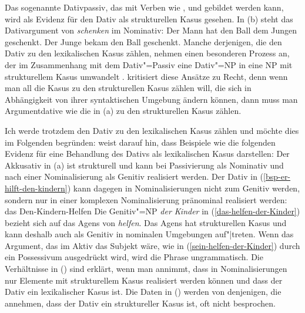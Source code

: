 %
%
Das sogenannte Dativpassiv, das mit Verben wie
,  und  gebildet werden kann,
wird als Evidenz für den Dativ als strukturellen Kasus gesehen.
In (b) steht das Dativargument von \emph{schenken} im Nominativ:
\eal
\ex Der Mann  hat   den Ball dem Jungen geschenkt.
\ex Der Junge bekam den Ball            geschenkt.
\zl
Manche derjenigen, die den Dativ zu den lexikalischen Kasus zählen, nehmen
einen besonderen Prozess an, der im Zusammenhang mit dem Dativ"=Passiv
eine Dativ"=NP in eine NP mit strukturellem Kasus umwandelt 
\parencites[Abschnitt~4.1]{Haider86}[]{HM94a}[]{Mueller99a}.
\citet{Gunkel2003b} kritisiert diese Ansätze zu Recht, denn wenn man all die
Kasus zu den strukturellen Kasus zählen will, die sich in Abhängigkeit von
ihrer syntaktischen Umgebung ändern können, dann muss man Argumentdative wie die
in (a) zu den strukturellen Kasus zählen.

Ich werde trotzdem den Dativ zu den lexikalischen Kasus zählen und möchte dies im Folgenden
begründen: \citet[]{Haider86} weist darauf hin, dass Beispiele wie die folgenden Evidenz
für eine Behandlung des Dativs als lexikalischen Kasus darstellen:
\eal
{}
\label{das-helfen-der-Kinder}
\label{sein-helfen-der-Kinder}
\zl
Der Akkusativ in (a) ist strukturell und kann bei Passivierung als Nominativ
und nach einer Nominalisierung als Genitiv realisiert werden.
Der Dativ in (\ref{bsp-er-hilft-den-kindern}) kann dagegen in Nominalisierungen nicht zum Genitiv werden,
sondern nur in einer komplexen Nominalisierung pränominal realisiert werden:
\ea
das Den-Kindern-Helfen
\z
Die Genitiv"=NP \emph{der Kinder} in (\ref{das-helfen-der-Kinder}) bezieht sich auf das Agens
von \emph{helfen}. Das Agens hat strukturellen Kasus und kann deshalb auch als Genitiv in
nominalen Umgebungen auf"|treten. Wenn das Argument, das im Aktiv das Subjekt wäre, wie in (\ref{sein-helfen-der-Kinder})
durch ein Possessivum ausgedrückt wird, wird die Phrase ungrammatisch. Die Verhältnisse in
() sind erklärt, wenn man annimmt, dass in Nominalisierungen nur Elemente mit strukturellem
Kasus realisiert werden können und dass der Dativ ein lexikalischer Kasus ist.
Die Daten in () werden von denjenigen, die annehmen, dass der Dativ ein struktureller Kasus ist, oft
nicht besprochen.

